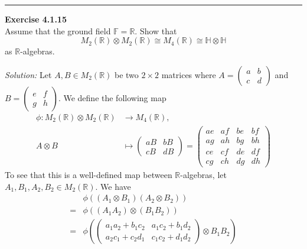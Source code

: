 \documentclass[a4paper, 12pt]{article}
\newenvironment{problem}[2][Exercise]
    { \begin{mdframed}[backgroundcolor=gray!20] \textbf{#1 #2} \\}
    {  \end{mdframed}}
\newenvironment{solution}
    {\textit{Solution:}}
    {}
\begin{document}
\noindent\rule{7in}{2.8pt}
\begin{problem}{4.1.15}
Assume that the ground field \(\mathbb{F}=\mathbb{R}\). Show that 
\[M_2(\mathbb{R})\otimes M_2(\mathbb{R})\cong M_4(\mathbb{R})\cong \mathbb{H}\otimes \mathbb{H}\]
as \(\mathbb{R}\)-algebras.
\end{problem}
\begin{solution}
Let \(A,B\in M_2(\mathbb{R})\) be two \(2\times 2\) matrices where \(A=\begin{pmatrix}
    a & b\\ 
    c&d
\end{pmatrix}\) and \(B=\begin{pmatrix}
    e&f\\ 
    g&h
\end{pmatrix}\). We define the following map 
\begin{align*}
    \phi:M_2(\mathbb{R})\otimes M_2(\mathbb{R})&\rightarrow M_4(\mathbb{R}),\\ 
             A\otimes B&\mapsto \begin{pmatrix}
                aB&bB\\ 
                cB&dB
             \end{pmatrix}=\begin{pmatrix}
                ae&af&be&bf\\ 
                ag&ah&bg&bh\\ 
                ce&cf&de&df\\ 
                cg&ch&dg&dh
             \end{pmatrix}
\end{align*}
To see that this is a well-defined map between \(\mathbb{R}\)-algebras, let \(A_1,B_1,A_2,B_2\in M_2(\mathbb{R})\). We have 
\begin{align*}
    &\phi((A_1\otimes B_1)(A_2\otimes B_2))\\[1em]
   =&\phi((A_1A_2)\otimes (B_1B_2))\\[1em]
   =&\phi(\begin{pmatrix}
    a_1a_2+b_1c_2&a_1c_2+b_1d_2\\
    a_2c_1+c_2d_1&c_1c_2+d_1d_2
   \end{pmatrix}\otimes B_1B_2 )\\[1em] 

\end{align*}
\end{solution}
\end{document}
